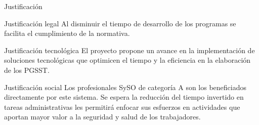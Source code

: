 \documentclass[spanish]{beamer} %
\begin{document}
\begin{frame}{Justificación}
  \begin{block}{Justificación legal}
    Al disminuir el tiempo de desarrollo de los programas se facilita el cumplimiento de la normativa.
  \end{block}
  \begin{block}{Justificación tecnológica}
    El proyecto propone un avance en la implementación de soluciones tecnológicas que optimicen el tiempo y la eficiencia en la elaboración de los PGSST. 
  \end{block}
  \begin{block}{Justificación social}
    Los profesionales SySO de categoría A son los beneficiados directamente por este sistema. Se espera la reducción del tiempo invertido en tareas administrativas les permitirá enfocar sus esfuerzos en actividades que aportan mayor valor a la seguridad y salud de los trabajadores.
  \end{block}
\end{frame}
\end{document}
